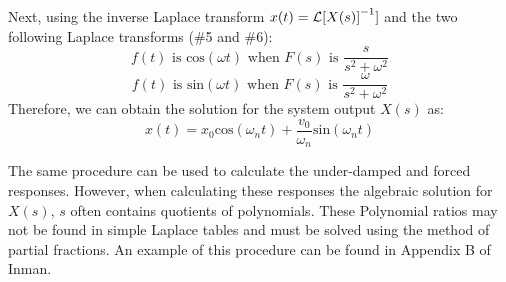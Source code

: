 \documentclass[12pt,letter]{article}
\begin{document}
			Next, using the inverse Laplace transform $x(t) = \mathcal{L}{\left[X(s)\right]}^{-1}]$ and the two following Laplace transforms (\#5 and \#6):
			\begin{equation}
			f(t) \text{ is cos}(\omega t) \text{ when }  F(s) \text{ is } \frac{s}{s^2+\omega^2} 
			\end{equation}
			\begin{equation}
			f(t) \text{ is sin}(\omega t)  \text{ when }  F(s) \text{ is } \frac{\omega}{s^2+\omega^2} 
			\end{equation}
			Therefore, we can obtain the solution for the system output $X(s)$ as:
			\begin{equation}
			x(t) = x_0 \text{cos}(\omega_n t) + \frac{v_0}{\omega_n}\text{sin}(\omega_n t)
			\end{equation}
			
			The same procedure can be used to calculate the under-damped and forced responses. However, when calculating these responses the algebraic solution for $X(s)$, $s$ often contains quotients of polynomials. These Polynomial ratios may not be found in simple Laplace tables and must be solved using the method of partial fractions. An example of this procedure can be found in Appendix B of Inman\protect\footnotemark[1]. 

\end{document}
